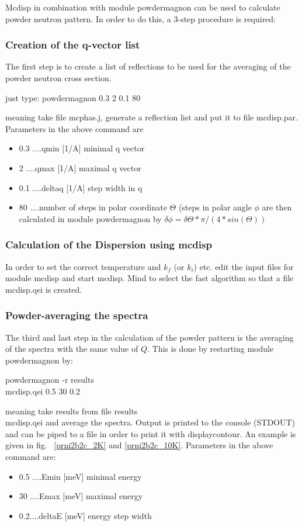 {\prg Mcdisp} in combination with module {\prg powdermagnon} can be used to calculate
powder neutron pattern. In order to do this, a 3-step procedure is required:

\subsubsection{Creation of the q-vector list}
The first step is to create a list of reflections to be used for 
the averaging of the powder neutron cross section. 

just type: powdermagnon 0.3 2 0.1 80

meaning take file {\prg mcphas.j}, generate a reflection list and put it to 
file {\prg mcdisp.par}. Parameters in the above command are 
\begin{itemize}
\item
 0.3 ....qmin   [1/A] minimal q vector
\item
 2   ....qmax   [1/A] maximal q vector
\item
 0.1 ....deltaq [1/A] step width in q
\item
 80  ....number of steps in polar coordinate $\Theta$
        (steps in polar angle $\phi$ are  then calculated in module
        {\prg powdermagnon} by $\delta \phi= \delta \Theta*\pi/(4*sin(\Theta))$
\end{itemize}

\subsubsection{Calculation of the Dispersion using {\prg mcdisp}}

In order to set the correct temperature and $k_f$ (or $k_i$) etc. edit
the input files for module {\prg mcdisp} and start {\prg mcdisp}. Mind 
to select the fast algorithm so that a file {\prg mcdisp.qei} is created.

\subsubsection{Powder-averaging the spectra}
The third and last step in the calculation of the powder pattern is the averaging
of the spectra with the same value of $Q$. This is done by restarting module
{\prg powdermagnon} by: 

powdermagnon -r results\\mcdisp.qei 0.5 30 0.2 

meaning take  results from file {\prg results\\mcdisp.qei} and average the
spectra. Output is printed to the console (STDOUT) and can be piped to a file in
order to print it with {\prg displaycontour}. An example is given in fig.~
\ref{prni2b2c_2K} and \ref{prni2b2c_10K}.
Parameters in the above command  are:
\begin{itemize}
\item 0.5 ....Emin   [meV] minimal energy
\item 30 ....Emax   [meV] maximal energy
\item 0.2....deltaE [meV] energy step width
\end{itemize}


